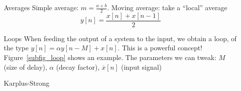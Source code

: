 \documentclass[11pt,a4paper]{article}
\begin{document}
\begin{itemize}
	\item[Averages] Simple average: $m = \frac{a+b}{2}$. Moving average: take a ``local'' average
	      \begin{equation}
		      y[n] = \frac{x[n] + x[n-1]}{2}
	      \end{equation}
	\item[Loops]When feeding the output of a system to the input, we obtain a loop, of the type $y[n] = \alpha y[n-M] + x[n]$. This is a powerful concept! Figure~\ref{subfig_loop} shows an example. The parameters we can tweak: $M$ (size of delay), $\alpha$ (decay factor), $\overline{x}[n]$ (input signal)
	\item[Karplus-Strong]\todo{}
\end{itemize}

\end{document}
